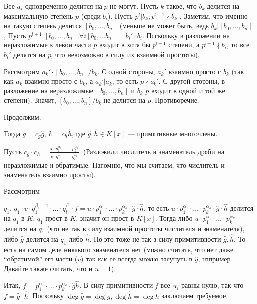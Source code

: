 Все \(a_i\) одновременно делится на \(p\) не могут. Пусть \(k\) такое, что \(b_k\) делится на максимальную степень \(p\) (среди \(b_i\)). Пусть \(p^l | b_k; p^{l + 1} \nmid b_k\) . Заметим, что именно на такую степень делится \([b_0, \ldots, b_n]\) (меньше не может быть, ведь \(b_k | [b_0, \ldots, b_n]\), Пусть \(p^{l + 1} | [b_0, \ldots, b_n]. \forall i [b_0, \ldots b_n] = b_i' \cdot b_i\). Поскольку в разложении на неразложимые в левой части \(p\) входит в хотя бы \(p^{l + 1}\) степени, а \(p^{l + 1} \nmid b_i\), то все \(b_i'\) делятся на \(p\), что невозможно в силу их взаимной простоты).

Рассмотрим \(a_k' \cdot [b_0, \ldots, b_n] / b_k\). С одной стороны, \(a_k'\) взаимно просто с \(b_k\) (так как \(a_k\) взаимно просто с \(b_k\), а \(a_k' | a_k\), то есть \(p \nmid a_k'\). С другой стороны, в разложение на неразложимые \([b_0, \ldots, b_n]\) и \(b_k\) \(p\) входит в одной и той же степени). Значит, \([b_0, \ldots, b_n] / b_k\) не делится на \(p\). Противоречие.

Продолжим.

Тогда \(g = c_g \hat{g}\), \(h = c_h \hat{h}\), где \(\hat{g}, \hat{h} \in K[x]\) --- примитивные многочлены.

Пусть \(c_g \cdot c_h = \frac{u \cdot p_1^{\alpha_1} \cdot \ldots \cdot p_k^{\alpha_k}} {v \cdot q_1^{\beta_1} \cdot \ldots \cdot q_l^{\beta_l}}\). (Разложили числитель и знаменатель дроби на неразложимые и обратимые. Напомню, что мы считаем, что числитель и знаменатель взаимно просты).

\hypertarget{9.3.no.denominator}{Рассмотрим} \(q_1\).
\(q_1 \cdot v \cdot q_1^{\beta_1 - 1} \cdot \ldots \cdot q_l^{\beta_l} \cdot f = u \cdot p_1^{\alpha_1} \cdot \ldots \cdot p_k^{\alpha_k} \cdot \hat{g} \cdot \hat{h}\), то есть
\(u \cdot p_1^{\alpha_1} \cdot \ldots \cdot p_k^{\alpha_k} \cdot \hat{g} \cdot \hat{h}\) делится на \(q_1\) в \(K\). \(q_1\) прост в \(K\), значит он прост в \(K[x]\). Тогда либо
\(u \cdot p_1^{\alpha_1} \cdot \ldots \cdot p_k^{\alpha_k}\) делится на \(q_1\) (что не так в силу взаимной простоты числителя и знаменателя), либо
\(\hat{g}\) делится на \(q_1\) либо \(\hat{h}\). Но это тоже не так в силу примитивности \(\hat{g}, \hat{h}\). То есть на самом деле никакого знаменателя нет (можно считать, что нет даже ``обратимой'' его части (\(v\)) так как ее всегда можно засунуть в \(\hat{g}\), например. Давайте также считать, что и \(u = 1\)).

Итак, \(f = p_1^{\alpha_1} \cdot \ldots \cdot p_k^{\alpha_k} \cdot \hat{g} \hat{h}\). В силу примитивности \(f\) все \(\alpha_i\) равны нулю, так что \(f = \hat{g} \cdot \hat{h}\). Поскольку \(\deg \hat{g} = \deg g, \deg \hat{h} = \deg h\) заключаем требуемое.

